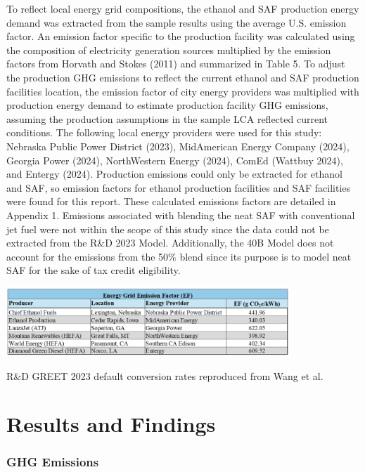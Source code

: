 \documentclass[12pt]{article}
\begin{document}
To reflect local energy grid compositions, the ethanol and SAF production energy demand was extracted from the sample results using the average U.S. emission factor. An emission factor specific to the production facility was calculated using the composition of electricity generation sources multiplied by the emission factors from Horvath and Stokes (2011) and summarized in Table 5. To adjust the production GHG emissions to reflect the current ethanol and SAF production facilities location, the emission factor of city energy providers was multiplied with production energy demand to estimate production facility GHG emissions, assuming the production assumptions in the sample LCA reflected current conditions. The following local energy providers were used for this study: Nebraska Public Power District (2023), MidAmerican Energy Company (2024), Georgia Power (2024), NorthWestern Energy (2024), ComEd (Wattbuy 2024), and Entergy (2024). Production emissions could only be extracted for ethanol and SAF, so emission factors for ethanol production facilities and SAF facilities were found for this report. These calculated emissions factors are detailed in Appendix 1. Emissions associated with blending the neat SAF with conventional jet fuel were not within the scope of this study since the data could not be extracted from the R\&D 2023 Model. Additionally, the 40B Model does not account for the emissions from the 50\% blend since its purpose is to model neat SAF for the sake of tax credit eligibility. 
\begin{table}[H]
\centering
\includegraphics[width=0.8\textwidth]{factors.png} %
\caption{R\&D GREET 2023 default conversion rates  reproduced from Wang et al.}
\label{fig:factors}
\end{table}

\section{Results and Findings}
\subsubsection{GHG Emissions}
\end{document}
